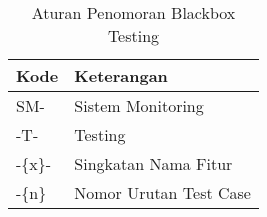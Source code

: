 \begin{table}[!h]
    \caption{Aturan Penomoran Blackbox Testing}
    \centering
    \begin{tabular}
        {
            >{\centering\arraybackslash}p{}
            >{\centering\arraybackslash}p{}
        }
        \toprule

        Kode &
        Keterangan \\ [1ex]

        \midrule

        SM- & Sistem Monitoring \\
        -T- & Testing \\
        -\{x\}- & Singkatan Nama Fitur \\
        -\{n\} & Nomor Urutan Test Case \\

        \bottomrule
    \end{tabular}
    \label{tab:nr-blackbox}
\end{table}